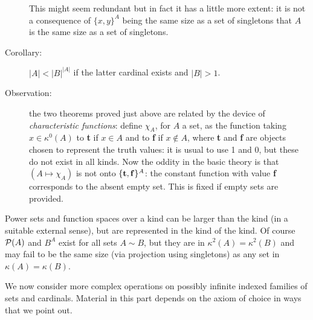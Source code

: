 \documentclass[12pt]{article}
\begin{document}
\begin{description}
This might seem redundant but in fact it has a little more extent:  it is not a consequence of $\{x,y\}^A$ being the same size as a set of singletons that $A$ is the same size as a set of singletons.

\item[Corollary:]  $|A|<|B|^{|A|}$ if the latter cardinal exists and $|B|>1$.

\item[Observation:]  the two theorems proved just above are related by the device of {\em characteristic functions\/}:  define $\chi_A$, for $A$ a set, as the function taking $x \in \kappa^0(A)$ to {\bf t} if $x \in A$ and to {\bf f} if $x \not\in A$, where {\bf t} and {\bf f} are objects chosen to represent the truth values:  it is usual to use 1 and 0, but these do not exist in all kinds.  Now the oddity in the basic theory is that $(A \mapsto \chi_A)$ is not onto $\{{\bf t},{\bf f}\}^A$:  the constant function with value {\bf f} corresponds to the absent empty set.  This is fixed if empty sets are provided.

\end{description}

Power sets and function spaces over a kind can be larger than the kind (in a suitable external sense), but are represented in the kind of the kind.  Of course ${\cal P}(A)$ and $B^A$ exist for all sets $A \sim B$,
but they are in $\kappa^2(A)=\kappa^2(B)$ and may fail to be the same size (via projection using singletons) as any set in $\kappa(A)=\kappa(B)$.

We now consider more complex operations on possibly infinite indexed families of sets and cardinals.  Material in this part depends on the axiom of choice in ways that we point out.
\end{document}
